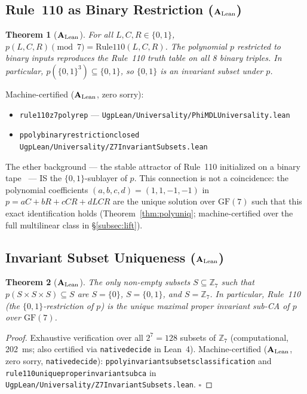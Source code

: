 \documentclass[11pt]{article}
\newtheorem{theorem}{Theorem}[section]
\theoremstyle{remark}
\newcommand{\ZS}{\ensuremath{\mathbb{Z}_7}}
\newcommand{\GF}[1]{\ensuremath{\mathrm{GF}(#1)}}
\newcommand{\lean}[1]{%
  \penalty-100
  \begingroup\def\_{\textunderscore\allowbreak}\texttt{#1}\endgroup}
\newcommand{\CatAL}{\texorpdfstring{\ensuremath{\textbf{A}_{\rm Lean}}}{A-Lean}}
\begin{document}
\subsection{Rule~110 as Binary Restriction (\CatAL{})}

\begin{theorem}[\CatAL{}]
\label{thm:r110}
For all $L, C, R \in \{0,1\}$, $p(L,C,R) \pmod{7} = \mathrm{Rule110}(L,C,R)$.
The polynomial $p$ restricted to binary inputs reproduces the Rule~110 truth
table on all 8 binary triples. In particular, $p(\{0,1\}^3) \subseteq \{0,1\}$,
so $\{0,1\}$ is an invariant subset under $p$.
\end{theorem}

{\sloppy\noindent Machine-certified (\CatAL{}, zero sorry):
\begin{itemize}[leftmargin=2.5em,itemsep=1pt,topsep=2pt]
  \item \lean{rule110\_z7\_poly\_rep} ---
    \lean{UgpLean/Universality/PhiMDLUniversality.lean}
  \item \lean{p\_poly\_binary\_restriction\_closed} \newline
    \lean{UgpLean/Universality/Z7InvariantSubsets.lean}
\end{itemize}}

The ether background --- the stable attractor of Rule~110 initialized on a
binary tape~\cite{Cook2004} --- IS the $\{0,1\}$-sublayer of $p$. This
connection is not a coincidence: the polynomial coefficients $(a, b, c, d) =
(1, 1, -1, -1)$ in $p = aC + bR + cCR + dLCR$ are the unique solution over
$\GF{7}$ such that this exact identification holds
(Theorem~\ref{thm:polyuniq}; machine-certified over the full multilinear
class in §\ref{subsec:lift}).

\subsection{Invariant Subset Uniqueness (\CatAL{})}

\begin{theorem}[\CatAL{}]
\label{thm:invariant}
The only non-empty subsets $S \subseteq \ZS$ such that $p(S \times S \times S)
\subseteq S$ are $S = \{0\}$, $S = \{0,1\}$, and $S = \ZS$. In particular,
Rule~110 (the $\{0,1\}$-restriction of $p$) is the unique maximal proper
invariant sub-CA of $p$ over $\GF{7}$.
\end{theorem}

\begin{proof}
Exhaustive verification over all $2^7 = 128$ subsets of $\ZS$ (computational,
202~ms; also certified via \lean{native\_decide} in Lean~4).
Machine-certified (\CatAL{}, zero sorry, \lean{native\_decide}):
\lean{p\_poly\_invariant\_subsets\_classification} and
\lean{rule110\_unique\_proper\_invariant\_subca} in
\lean{UgpLean/Universality/Z7InvariantSubsets.lean}. $\square$
\end{proof}
\end{document}
